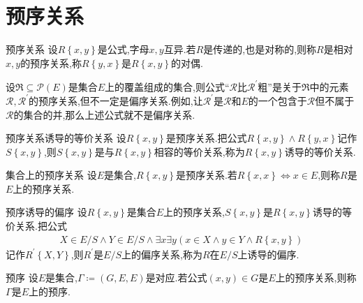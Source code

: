 \section{预序关系}

\begin{definition}{预序关系}{}
	设$R\left\{x,y\right\}$是公式,字母$x,y$互异.若$R$是传递的,也是对称的,则称$R$是相对$x,y$的预序关系,称$R\left\{y,x\right\}$是$R\left\{x,y\right\}$的对偶.
\end{definition}

\begin{example}{}{}
	设$\mathfrak{R}\subseteq\mathcal{P}\left(E\right)$是集合$E$上的覆盖组成的集合,则公式``$\mathcal{R}$比$\mathcal{R}^{\prime}$粗''是关于$\mathfrak{R}$中的元素$\mathcal{R},\mathcal{R}^{\prime}$的预序关系,但不一定是偏序关系.例如,让$\mathcal{R}^{\prime}$是$\mathcal{R}$和$E$的一个包含于$\mathcal{R}$但不属于$\mathcal{R}$的集合的并,那么上述公式就不是偏序关系.
\end{example}

\begin{definition}{预序关系诱导的等价关系}{}
	设$R\left\{x,y\right\}$是预序关系.把公式$R\left\{x,y\right\}\wedge R\left\{y,x\right\}$记作$S\left\{x,y\right\}$,则$S\left\{x,y\right\}$是与$R\left\{x,y\right\}$相容的等价关系,称为$R\left\{x,y\right\}$诱导的等价关系.
\end{definition}

\begin{definition}{集合上的预序关系}{}
	设$E$是集合,$R\left\{x,y\right\}$是预序关系.若$R\left\{x,x\right\}\iff x\in E$,则称$R$是$E$上的预序关系.
\end{definition}

\begin{proposition}{预序诱导的偏序}{}
	设$R\left\{x,y\right\}$是集合$E$上的预序关系,$S\left\{x,y\right\}$是$R\left\{x,y\right\}$诱导的等价关系.把公式
	\begin{align*}
		X\in E/S\wedge Y\in E/S\wedge \exists x\exists y\left(x\in X\wedge y\in Y\wedge R\left\{x,y\right\}\right)
	\end{align*}
	记作$R^{\prime}\left\{X,Y\right\}$,则$R^{\prime}$是$E/S$上的偏序关系,称为$R$在$E/S$上诱导的偏序.
\end{proposition}

\begin{definition}{预序}{}
	设$E$是集合,$\Gamma\coloneq\left(G,E,E\right)$是对应.若公式$\left(x,y\right)\in G$是$E$上的预序关系,则称$\Gamma$是$E$上的预序.
\end{definition}

